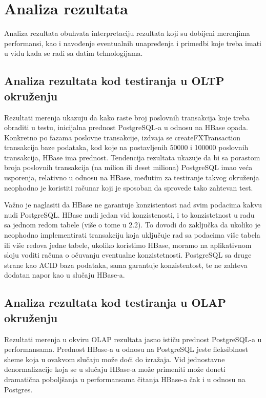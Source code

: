 \documentclass[12pt,oneside]{memoir}
\begin{document}
\chapter{Analiza rezultata}

Analiza rezultata obuhvata interpretaciju rezultata koji su dobijeni merenjima performansi, kao i navođenje eventualnih unapređenja i primedbi koje treba imati u vidu kada se radi sa datim tehnologijama.

\section{Analiza rezultata kod testiranja u OLTP okruženju}

Rezultati merenja ukazuju da kako raste broj poslovnih transakcija koje treba obraditi u testu, inicijalna prednost PostgreSQL-a u odnosu na HBase opada. Konkretno po fazama poslovne transakcije, izdvaja se createFXTransaction transakcija baze podataka, kod koje na postavljenih 50000 i 100000  poslovnih transakcija, HBase ima prednost. Tendencija rezultata ukazuje da bi sa porastom broja poslovnih transakcija (na milion ili deset miliona) PostgreSQL imao veća usporenja, relativno u odnosu na HBase, međutim za testiranje takvog okruženja neophodno je koristiti računar koji je sposoban da sprovede tako zahtevan test.

Važno je naglasiti da HBase ne garantuje konzistentost nad svim podacima kakvu nudi PostgreSQL. HBase nudi jedan vid konzistenosti, i to konzistetnost u radu sa jednom redom tabele (više o tome u 2.2). To dovodi do zaključka da ukoliko je neophodno implementirati transakciju koja uključuje rad sa podacima više tabela ili više redova jedne tabele, ukoliko koristimo HBase, moramo na aplikativnom sloju voditi računa o očuvanju  eventualne konzistetnosti. PostgreSQL sa druge strane kao ACID baza podataka, sama garantuje konzistentost, te ne zahteva dodatan napor kao u slučaju HBase-a. 

\section{Analiza rezultata kod testiranja u OLAP okruženju}

Rezultati merenja u okviru OLAP rezultata jasno ističu prednost PostgreSQL-a u performansama. Prednost HBase-a u odnosu na PostgreSQL jeste fleksiblnost sheme koja u ovakvom slučaju može doći do izražaja. Vid jednostavne denormalizacije koja se u slučaju HBase-a može primeniti može doneti dramatična poboljšanja u performansama čitanja HBase-a čak i u odnosu na Postgres. 
\end{document}
